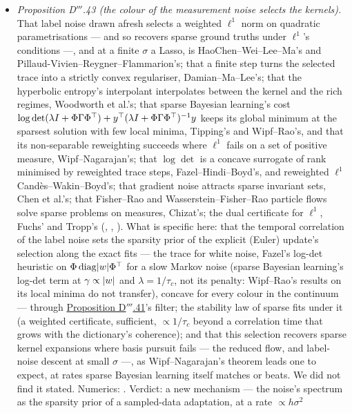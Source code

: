 \begin{itemize}
  \item \emph{Proposition D$'''$.43 (the colour of the measurement noise selects the kernels).} That label noise drawn
    afresh selects a weighted $\ell^1$ norm on quadratic parametrisations --- and so recovers sparse ground truths under
    $\ell^1$'s conditions ---, and at a finite $\sigma$ a Lasso, is HaoChen--Wei--Lee--Ma's and
    Pillaud-Vivien--Reygner--Flammarion's; that a finite step turns the selected trace into a strictly convex
    regulariser, Damian--Ma--Lee's; that the hyperbolic entropy's interpolant interpolates between the kernel and the
    rich regimes, Woodworth et al.'s; that sparse Bayesian learning's cost
    $\log\det(\lambda I + \Phi\Gamma\Phi^\top) + y^\top(\lambda I + \Phi\Gamma\Phi^\top)^{-1}y$ keeps its global minimum at the
    sparsest solution with few local minima, Tipping's and Wipf--Rao's, and that its non-separable reweighting succeeds
    where $\ell^1$ fails on a set of positive measure, Wipf--Nagarajan's; that $\log\det$ is a concave surrogate of rank
    minimised by reweighted trace steps, Fazel--Hindi--Boyd's, and reweighted $\ell^1$ Cand\`es--Wakin--Boyd's; that
    gradient noise attracts sparse invariant sets, Chen et al.'s; that Fisher--Rao and Wasserstein--Fisher--Rao particle
    flows solve sparse problems on measures, Chizat's; the dual certificate for $\ell^1$, Fuchs' and Tropp's
    (\cite{S69}, \cite{S70}, \cite{S72}). What is specific here: that the temporal correlation of the label noise sets the
    sparsity prior of the explicit (Euler) update's selection along the exact fits --- the trace for white noise, Fazel's
    log-det heuristic on $\Phi\operatorname{diag}\lvert w\rvert\Phi^\top$ for a slow Markov noise (sparse Bayesian learning's
    log-det term at $\gamma\propto\lvert w\rvert$ and $\lambda = 1/\tau_c$, not its penalty: Wipf--Rao's results on its local
    minima do not transfer), concave for every colour in the continuum --- through
    \hyperref[res:thmDppp:41]{Proposition D$'''$.41}'s filter; the stability law of sparse fits under it (a weighted
    certificate, sufficient, $\propto1/\tau_c$ beyond a correlation time that grows with the dictionary's coherence); and
    that this selection recovers sparse kernel expansions where basis pursuit fails --- the reduced flow, and label-noise
    descent at small $\sigma$ ---, as Wipf--Nagarajan's theorem leads one to expect, at rates sparse Bayesian learning
    itself matches or beats. We did not find it stated. Numerics: . Verdict: a new
    mechanism --- the noise's spectrum as the sparsity prior of a sampled-data adaptation, at a rate $\propto h\sigma^2$

\end{itemize}
